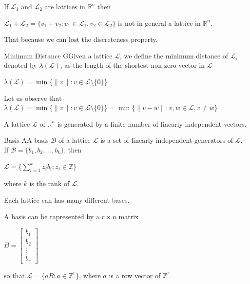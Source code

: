 \noindent
If $\mathcal{L}_1$ and $\mathcal{L}_2$ are lattices in $\mathbb{R}^n$ then
\begin{center}
    $\mathcal{L}_1 + \mathcal{L}_2 = \{v_1 + v_2: v_1 \in \mathcal{L}_1, v_2 \in \mathcal{L}_2\}$ is not in general a lattice in $\mathbb{R}^n$.
\end{center}
That because we can lost the discreteness property.
\bigskip

\begin{defBox}{Minimum Distance}
    GGiven a lattice $\mathcal{L}$, we define the minimum distance of $\mathcal{L}$, denoted by $\lambda(\mathcal{L})$, as the length of the shortest non-zero vector in $\mathcal{L}$
    \begin{center}
        $\lambda(\mathcal{L}) = \min\{\|v\|: v \in \mathcal{L} \setminus \{0\}\}$
    \end{center}
\end{defBox}
\noindent
Let us observe that $\lambda(\mathcal{L}) = \min\{\|v\|: v \in \mathcal{L} \setminus \{0\}\} = \min \{\|v - w\|: v, w \in \mathcal{L}, v \neq w\}$
\bigskip 

\noindent
A lattice $\mathcal{L}$ of $\mathbb{R}^n$ is generated by a finite number of linearly independent vectors.

\begin{defBox}{Basis}
    AA basis $\mathcal{B}$ of a lattice $\mathcal{L}$ is a set of linearly independent generators of $\mathcal{L}$.\\
    If $\mathcal{B} = \{b_1, b_2, \ldots, b_k\}$, then 
    \begin{center}
        $\mathcal{L} = \{\sum_{i=1}^k z_i b_i: z_i \in \mathbb{Z}\}$
    \end{center}
    where $k$ is the rank of $\mathcal{L}$.
\end{defBox}

\noindent
Each lattice can has many different bases.
\medskip

\noindent
A basis can be rapresented by a $r \times n$ matrix
\begin{center}
    $B = \begin{bmatrix}
    b_{1}\\
    b_{2}\\
    \vdots\\
    b_{r}
    \end{bmatrix}$
\end{center}
so that $\mathcal{L} = \{aB: a \in \mathbb{Z}^r\}$, where $a$ is a row vector of $\mathbb{Z}^r$.
\medskip

